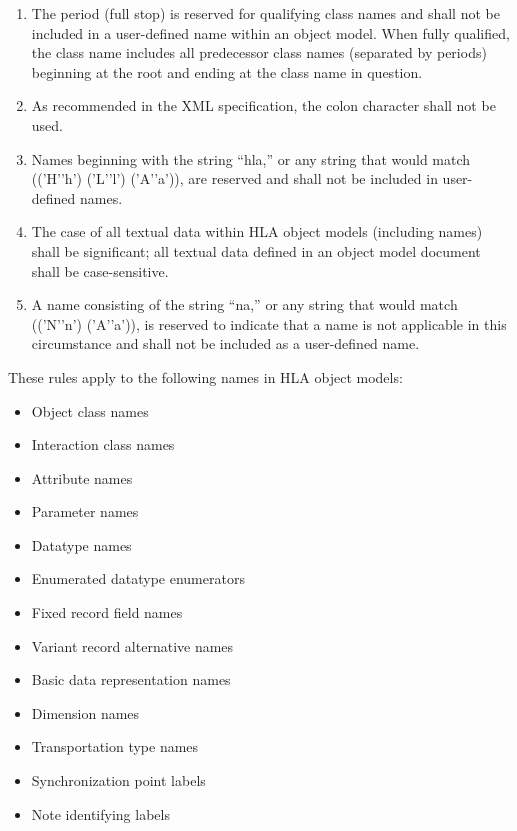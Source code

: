 \begin{enumerate}[label=\alph*)]
\item The period (full stop) is reserved for qualifying class names and shall not be included in a user-defined name within an object model. When fully qualified, the class name includes all predecessor class names (separated by periods) beginning at the root and ending at the class name in question.
\item As recommended in the XML specification, the colon character shall not be used.
\item Names beginning with the string ``hla,'' or any string that would match (('H'\textbar{}'h') ('L'\textbar{}'l') ('A'\textbar{}'a')), are reserved and shall not be included in user-defined names.
\item The case of all textual data within HLA object models (including names) shall be significant; all textual data defined in an object model document shall be case-sensitive.
\item A name consisting of the string ``na,'' or any string that would match (('N'\textbar{}'n') ('A'\textbar{}'a')), is reserved to indicate that a name is not applicable in this circumstance and shall not be included as a user-defined name.
\end{enumerate}

These rules apply to the following names in HLA object models:

\begin{itemize}
    \item Object class names
    \item Interaction class names
    \item Attribute names
    \item Parameter names
    \item Datatype names
    \item Enumerated datatype enumerators
    \item Fixed record field names
    \item Variant record alternative names
    \item Basic data representation names
    \item Dimension names
    \item Transportation type names
    \item Synchronization point labels
    \item Note identifying labels
\end{itemize}
